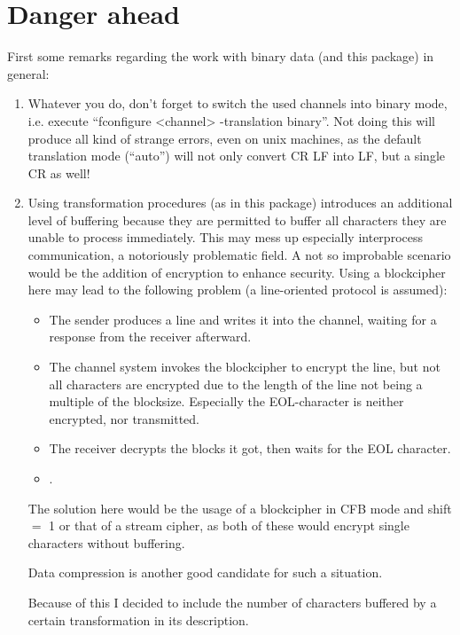 \documentclass {report}
\begin{document}
\chapter {Danger ahead}

First some remarks regarding the work with binary data (and this
package) in general:

\begin {enumerate}
\item	Whatever you do, don't forget to switch the used channels into
	binary mode, i.e. execute ``fconfigure <channel> -translation
	binary''. Not doing this will produce all kind of strange
	errors, even on unix machines, as the default translation mode
	(``auto'') will not only convert CR LF into LF, but a single
	CR as well!

\item	Using transformation procedures (as in this package)
	introduces an additional level of buffering because they are
	permitted to buffer all characters they are unable to process
	immediately. This may mess up especially
	interprocess communication, a notoriously problematic field. A
	not so improbable scenario would be the addition of encryption
	to enhance security. Using a blockcipher here may lead to the
	following problem (a line-oriented protocol is assumed):

	\begin {itemize}
	\item	The sender produces a line and writes it into the channel,
		waiting for a response from the receiver afterward.
	\item	The channel system invokes the blockcipher to encrypt
		the line, but not all characters are encrypted due to
		the length of the line not being a multiple of the
		blocksize. Especially the EOL-character is neither
		encrypted, nor transmitted.
	\item	The receiver decrypts the blocks it got, then waits
		for the EOL character.
	\item	{}.
	\end   {itemize}

	The solution here would be the usage of a blockcipher in CFB
	mode and shift $=$ 1 or that of a stream cipher, as both of these
	would encrypt single characters without buffering.

	Data compression is another good candidate for such a situation.

	Because of this I decided to include the number of characters
	buffered by a certain transformation in its description.

\end   {enumerate}
\end{document}
